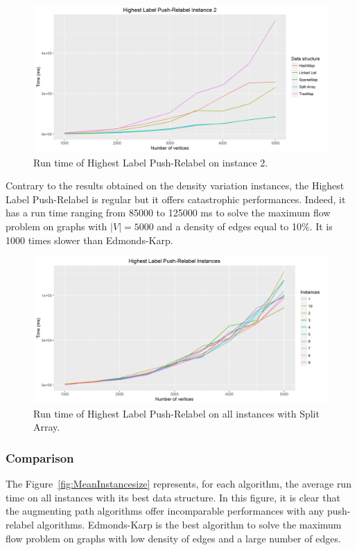 \begin{figure}[H]
\includegraphics[scale=0.5]{images/HLPR2.png}
\caption{Run time of Highest Label Push-Relabel on instance 2.}
\label{fig:HLPR2}
\end{figure}

Contrary to the results obtained on the density variation instances, the Highest Label Push-Relabel is regular but it offers catastrophic performances. Indeed, it has a run time ranging from 85000 to 125000 ms to solve the maximum flow problem on graphs with $|V|=5000$ and a density of edges equal to 10\%. It is 1000 times slower than Edmonds-Karp.

\begin{figure}[H]
\includegraphics[scale=0.5]{images/HLPRmean.png}
\caption{Run time of Highest Label Push-Relabel on all instances with Split Array.}
\label{fig:HLPRmean}
\end{figure}

\subsubsection{Comparison}
The Figure~\ref{fig:MeanInstancesize} represents, for each algorithm, the average run time on all instances with its best data structure. In this figure, it is clear that the augmenting path algorithms offer incomparable performances with any push-relabel algorithms. Edmonds-Karp is the best algorithm to solve the maximum flow problem on graphs with low density of edges and a large number of edges.


